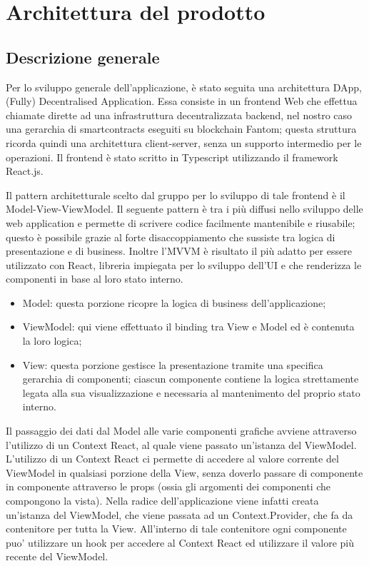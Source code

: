 \section{Architettura del prodotto}\label{section:architettura del prodotto}
\subsection{Descrizione generale}

Per lo sviluppo generale dell'applicazione, è stato seguita una architettura DApp, (Fully) Decentralised Application.
Essa consiste in un frontend Web che effettua chiamate dirette ad una infrastruttura decentralizzata backend, nel 
nostro caso una gerarchia di smartcontracts eseguiti su blockchain Fantom; 
questa struttura ricorda quindi una architettura client-server, senza un supporto intermedio per le operazioni.
Il frontend è stato scritto in Typescript utilizzando il framework React.js.

Il pattern architetturale scelto dal gruppo per lo sviluppo di tale frontend è il Model-View-ViewModel. Il
seguente pattern è tra i più diffusi nello sviluppo delle web application e permette di scrivere codice
facilmente mantenibile e riusabile; questo è possibile grazie al forte disaccoppiamento che sussiste tra
logica di presentazione e di business. Inoltre l'MVVM è risultato il più adatto per essere utilizzato con
React, libreria impiegata per lo sviluppo dell'UI e che renderizza le componenti in base al loro stato
interno.
\begin{itemize}
\item Model: questa porzione ricopre la logica di business dell'applicazione; %
\item ViewModel: qui viene effettuato il binding tra View e Model ed è contenuta la loro logica;
\item View: questa porzione gestisce la presentazione tramite una specifica gerarchia di componenti;
ciascun componente contiene la logica strettamente legata alla sua visualizzazione e necessaria al
mantenimento del proprio stato interno.
\end{itemize}

Il passaggio dei dati dal Model alle varie componenti grafiche avviene attraverso l'utilizzo di un Context
React, al quale viene passato un'istanza del ViewModel. L'utilizzo di un Context React ci permette di
accedere al valore corrente del ViewModel in qualsiasi porzione della View, senza doverlo passare di
componente in componente attraverso le props (ossia gli argomenti dei componenti che compongono la
vista). Nella radice dell'applicazione viene infatti creata un'istanza del ViewModel, che viene passata
ad un Context.Provider, che fa da contenitore per tutta la View. All'interno di tale contenitore ogni
componente puo' utilizzare un hook per accedere al Context React ed utilizzare il valore più recente del ViewModel.

